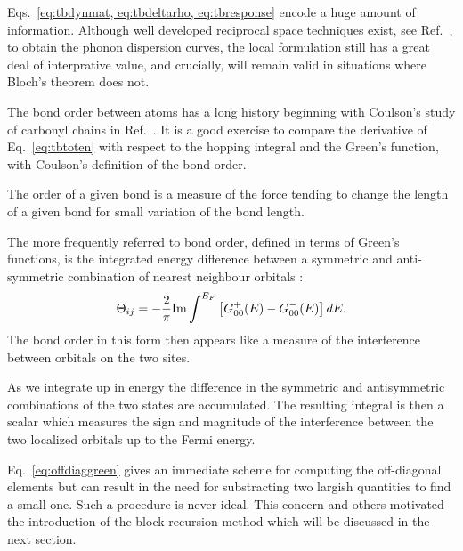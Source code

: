  
Eqs.~\ref{eq:tbdynmat, eq:tbdeltarho, eq:tbresponse} encode
a huge amount of information. Although well developed reciprocal space 
techniques exist, see Ref.~\cite{baroni01}, to obtain the phonon dispersion
curves, the local formulation still has a great deal of 
interprative value, and crucially, will remain valid
in situations where Bloch's theorem does not.

The bond order between atoms has a long history
beginning with Coulson's study of carbonyl 
chains in Ref.~\cite{coulson39}. It is a good exercise to compare
the derivative of Eq.~\ref{eq:tbtoten} with respect
to the hopping integral and the Green's function,
with Coulson's definition of the bond order.

The order of a given bond is a measure
of the force tending to change the length of a given bond
for small variation of the bond length.

The more frequently referred to bond order, defined
in terms of Green's functions, is the integrated 
energy difference between a symmetric 
and anti-symmetric combination of nearest neighbour 
orbitals \cite{pettifor89}:
%
\begin{equation}
\label{eq:bondorder}
\Theta_{ij} = - \frac{2}{\pi} {\rm Im} \int^{E_{F}}\left[G^{+}_{00}(E)-G_{00}^{-}(E)\right]dE.
\end{equation}
%
The bond order in this form then appears like a measure of the interference 
between orbitals on the two sites.

As we integrate up in energy the difference in the symmetric and antisymmetric 
combinations of the two states are accumulated. The resulting integral is 
then a scalar which measures the sign and magnitude of the
interference between the two localized orbitals up to the Fermi energy.

Eq.~\ref{eq:offdiaggreen} gives an immediate scheme for computing the off-diagonal
elements but can result in the need for substracting two largish quantities to find
a small one. Such a procedure is never ideal. This concern and others motivated the introduction
of the block recursion method which will be discussed in the next section.

